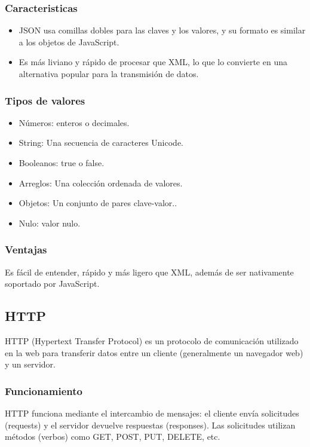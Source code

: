 \begin{center}
	\subsubsection{Caracteristicas}
	\begin{itemize}
		\item JSON usa comillas dobles para las claves y los valores, y su formato es similar a los objetos de JavaScript.
		\item Es más liviano y rápido de procesar que XML, lo que lo convierte en una alternativa popular para la transmisión de datos.
	\end{itemize}

	\subsubsection{Tipos de valores}
	\begin{itemize}
		\item Números: enteros o decimales.
		\item String: Una secuencia de caracteres Unicode.
		\item Booleanos: true o false.
		\item Arreglos: Una colección ordenada de valores.
		\item Objetos: Un conjunto de pares clave-valor..
		\item Nulo: valor nulo.
	\end{itemize}

	\subsubsection{Ventajas}
	Es fácil de entender, rápido y más ligero que XML, además de ser nativamente soportado por JavaScript.

	\subsection{HTTP}

	HTTP (Hypertext Transfer Protocol) es un protocolo de comunicación utilizado en
	la web para transferir datos entre un cliente (generalmente un navegador web) y un servidor.

	\subsubsection{Funcionamiento}

	HTTP funciona mediante el intercambio de mensajes: el cliente envía solicitudes (requests) y el servidor
	devuelve respuestas (responses). Las solicitudes utilizan métodos (verbos) como GET, POST, PUT, DELETE, etc.


\end{center}
